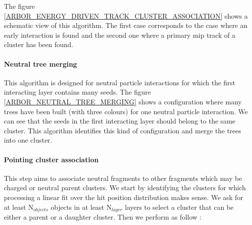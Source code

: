 \documentclass[cits]{JINST}
\begin{document}
The figure \ref{ARBOR_ENERGY_DRIVEN_TRACK_CLUSTER_ASSOCIATION} shows a schematic view of this algorithm. The first case corresponds to the case where an early interaction is found and the second one where a primary mip track of a cluster has been found.

\paragraph*{Neutral tree merging} This algorithm is designed for neutral particle interactions for which the first interacting layer contains many seeds. The figure \ref{ARBOR_NEUTRAL_TREE_MERGING} shows a configuration where many trees have been built (with three colours) for one neutral particle interaction. We can see that the seeds in the first interacting layer should belong to the same cluster. This algorithm identifies this kind of configuration and merge the trees into one cluster.

\paragraph*{Pointing cluster association} This step aims to associate neutral fragments to other fragments which may be charged or neutral parent clusters. We start by identifying the clusters for which processing a linear fit over the hit position distribution makes sense. We ask for at least N$_{objects}$ objects in at least N$_{layer}$ layers to select a cluster that can be either a parent or a daughter cluster. Then we perform as follow :
\end{document}

